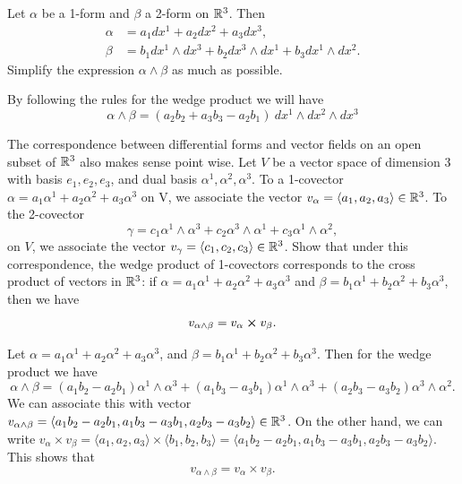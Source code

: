 \begin{problem}
	Let $ \alpha $ be a 1-form and $ \beta $ a 2-form on $ \mathbb{R}^3 $. Then
	\begin{align*}
		\alpha &= a_1 dx^1 + a_2 dx^2 + a_3 dx^3,\\
		\beta &= b_1 dx^1\wedge dx^3 + b_2 dx^3 \wedge dx^1 + b_3 dx^1\wedge dx^2.
	\end{align*}
	Simplify the expression $ \alpha\wedge \beta $ as much as possible.
\end{problem}

\begin{solution}
	By following the rules for the wedge product we will have
	\[ \alpha \wedge \beta = (a_2b_2 + a_3b_3 - a_2b_1)\ dx^1\wedge dx^2 \wedge dx^3 \]
\end{solution}

\begin{problem}
	The correspondence between differential forms and vector fields on an open subset of $ \mathbb{R}^3 $ also makes sense point wise. Let $ V $ be a vector space of dimension $ 3 $ with basis $ e_1,e_2,e_3 $, and dual basis $ \alpha^1,\alpha^2,\alpha^3 $. To a 1-covector $ \alpha = a_1 \alpha^1 + a_2 \alpha^2 + a_3 \alpha^3 $ on V, we associate the vector $ v_\alpha =  \langle a_1,a_2,a_3 \rangle \in \mathbb{R}^3 $. To the 2-covector
	\[ \gamma = c_1\alpha^1 \wedge \alpha^3 + c_2 \alpha^3 \wedge \alpha^1 + c_3 \alpha^1 \wedge \alpha^2, \]
	on $ V $, we associate the vector $ v_\gamma = \langle c_1,c_2,c_3 \rangle \in \mathbb{R}^3 $. Show that under this correspondence, the wedge product of 1-covectors corresponds to the cross product of vectors in $ \mathbb{R}^3 $: if $ \alpha = a_1 \alpha^1 + a_2\alpha^2 + a_3\alpha^3 $ and $ \beta = b_1\alpha^1 + b_2\alpha^2 + b_3\alpha^3 $, then we have
	\[ v_{\alpha\wedge \beta} = v_\alpha \cross v_\beta. \]
\end{problem}

\begin{solution}
	Let $ \alpha = a_1 \alpha^1 + a_2 \alpha^2 + a_3 \alpha^3 $, and $ \beta = b_1 \alpha^1 + b_2 \alpha^2 + b_3 \alpha^3 $. Then for the wedge product we have
	\[ \alpha\wedge\beta = (a_1b_2 - a_2b_1)\alpha^1\wedge\alpha^3 + (a_1b_3 - a_3b_1)\alpha^1\wedge\alpha^3 + (a_2b_3 - a_3b_2)\alpha^3\wedge\alpha^2. \]
	We can associate this with vector $ v_{\alpha\wedge\beta} = \langle a_1b_2 - a_2b_1, a_1b_3 - a_3b_1, a_2b_3 - a_3b_2 \rangle \in \mathbb{R}^3 $. On the other hand, we can write
	$ v_\alpha\times v_\beta = \langle a_1,a_2,a_3 \rangle \times \langle b_1,b_2,b_3 \rangle = \langle a_1b_2 - a_2b_1, a_1b_3 - a_3b_1, a_2b_3 - a_3b_2 \rangle $. This shows that 
	\[ v_{\alpha\wedge\beta} = v_\alpha\times v_\beta. \]
\end{solution}

